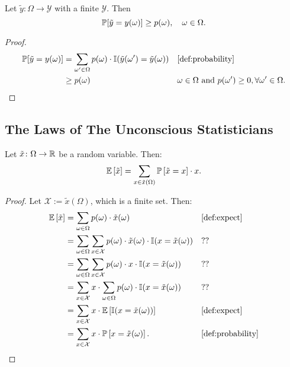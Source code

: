 \begin{lemma} \label{lem:prob-ge-measure}
  Let $\tilde{y}\colon \Omega \to \mathcal{Y}$ with a finite $\mathcal{Y}$. Then
  \[
   \mathbb{P}[\tilde{y} = y(\omega)] \ge p(\omega ), \quad \omega \in \Omega . 
  \]
\end{lemma}
\begin{proof}
 \begin{align*}
   \PP[\tilde{y} = y(\omega)]
   &= \sum_{\omega' \in \Omega } p(\omega) \cdot \I(\tilde{y}(\omega') = \tilde{y}(\omega)) && \text{\cref{def:probability}} \\
   &\ge p(\omega ) && \omega \in \Omega \text{ and } p(\omega') \ge 0, \forall \omega '\in \Omega. 
 \end{align*}
\end{proof}

\subsection{The Laws of The Unconscious Statisticians}

\begin{theorem} \label{thm:exp-sum-val}
Let $\tilde{x} \colon \Omega \to \mathbb{R} $ be a random variable. Then:
\[
\mathbb{E} \left[ \tilde{x} \right]
=
\sum_{x\in \tilde{x}(\Omega)} \mathbb{P} \left[ \tilde{x} = x \right] \cdot  x. 
\]
\end{theorem}
\begin{proof}
Let $\mathcal{X} := \tilde{x}(\Omega)$, which is a finite set. Then:
\begin{align*}
\E \left[ \tilde{x} \right]
&= \sum_{\omega \in \Omega } p(\omega ) \cdot \tilde{x}(\omega) && \text{\cref{def:expect}} \\
&= \sum_{\omega \in \Omega } \sum_{x\in \mathcal{X}} p(\omega ) \cdot \tilde{x}(\omega) \cdot \I(x =  \tilde{x}(\omega)) && \text{??} \\
&= \sum_{\omega \in \Omega } \sum_{x\in \mathcal{X}} p(\omega ) \cdot x \cdot \I(x =  \tilde{x}(\omega)) && \text{??} \\
&= \sum_{x\in \mathcal{X}} x \cdot \sum_{\omega \in \Omega }  p(\omega ) \cdot  \I(x =  \tilde{x}(\omega))  && \text{??}\\
&= \sum_{x\in \mathcal{X}} x \cdot \E \left[  \I(x =  \tilde{x}(\omega)) \right] && \text{\cref{def:expect}} \\
&= \sum_{x\in \mathcal{X}} x \cdot \PP \left[x =  \tilde{x}(\omega) \right]. && \text{\cref{def:probability}} 
\end{align*}
\end{proof}

